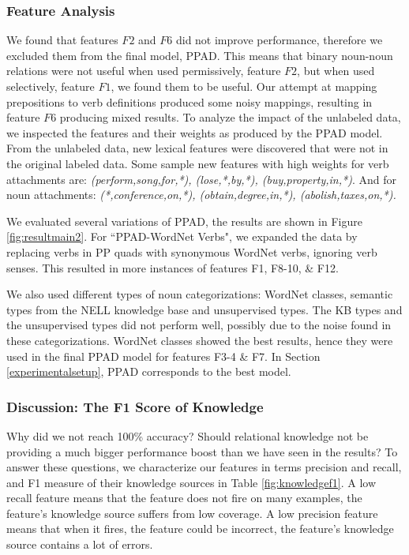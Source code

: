  \subsubsection{Feature Analysis}
We found that features $F2$ and $F6$ did not improve performance, therefore we  excluded them from the final model, PPAD. This means that binary noun-noun relations were not useful when used permissively, feature $F2$, but when used selectively, feature $F1$, we found them to be useful. Our attempt at mapping prepositions to  verb definitions produced some noisy mappings, resulting in feature $F6$  producing mixed results.
To analyze the impact of the unlabeled data, we inspected the  features and their weights as produced by the PPAD model. From the unlabeled data, new  lexical features were discovered  that were not in the original labeled data.   Some sample  new features with high weights for verb attachments are: \textit{ (perform,song,for,*), %
(lose,*,by,*),  (buy,property,in,*)}. And for noun attachments: \textit{(*,conference,on,*), (obtain,degree,in,*), (abolish,taxes,on,*).} 


We evaluated several variations of PPAD, the results are shown in 
Figure \ref{fig:resultmain2}. For ``PPAD-WordNet Verbs",  we expanded the data by  replacing verbs in PP quads with synonymous WordNet verbs, ignoring verb senses.  This resulted in more instances of features F1, F8-10, \& F12. 

We also used  different types of noun categorizations: WordNet classes, semantic types from the NELL
knowledge base \cite{MitchellCHTBCMG15} and unsupervised types.  The KB types and the unsupervised types did not perform well, possibly due to the noise found in these categorizations.  WordNet classes showed the best results, hence they were used in  the final PPAD model for   features F3-4 \& F7.  In Section \ref{experimentalsetup}, PPAD corresponds to the best model.
  
     
     
 \subsubsection{Discussion: The F1 Score of Knowledge}
Why did we not  reach 100\% accuracy? Should relational knowledge not be providing a much bigger performance boost than we have seen in the results?
To answer these questions, we characterize our features in terms  precision and recall, and  F1 measure of their knowledge sources in Table \ref{fig:knowledgef1}. A low recall feature means that the feature does not fire on many examples, the feature's knowledge source suffers from low coverage.  A low precision feature means that when it fires, the feature could be incorrect, the feature's knowledge source contains a lot of errors. 
  

